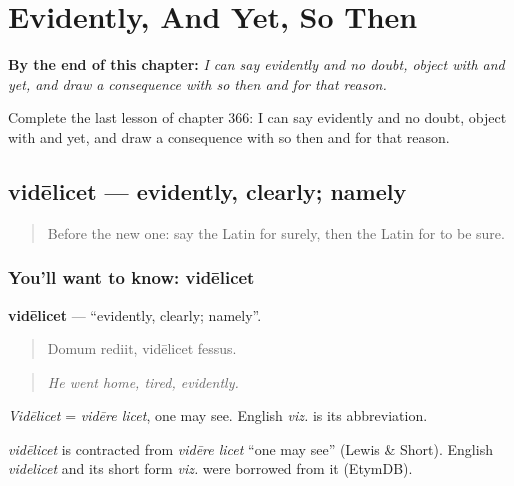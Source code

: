 
\chapter{Evidently, And Yet, So Then}
\label{ch:la-evidently-and-yet-so-then}

\begin{chapteropening}
\textbf{By the end of this chapter:} \emph{I can say evidently and no doubt, object with and yet, and draw a consequence with so then and for that reason.}

Complete the last lesson of chapter 366: I can say evidently and no doubt, object with and yet, and draw a consequence with so then and for that reason.
\end{chapteropening}

\section[vidēlicet]{vidēlicet — evidently, clearly; namely}

\label{lesson:LA-C366-videlicet}



\begin{quote}
Before the new one: say the Latin for surely, then the Latin for to be sure.
\end{quote}

\subsection*{You'll want to know: vidēlicet}
\textbf{vidēlicet} — \textquotedblleft{}evidently, clearly; namely\textquotedblright{}.

\begin{quote}
Domum rediit, vidēlicet fessus.
\end{quote}

\begin{quote}
\emph{He went home, tired, evidently.}
\end{quote}

\emph{Vidēlicet} = \emph{vidēre licet}, one may see. English \emph{viz.} is its abbreviation.

\begin{cousinweb}
\emph{vidēlicet} is contracted from \emph{vidēre licet} \textquotedblleft{}one may see\textquotedblright{} (Lewis \& Short). English \emph{videlicet} and its short form \emph{viz.} were borrowed from it (EtymDB).
\end{cousinweb}

